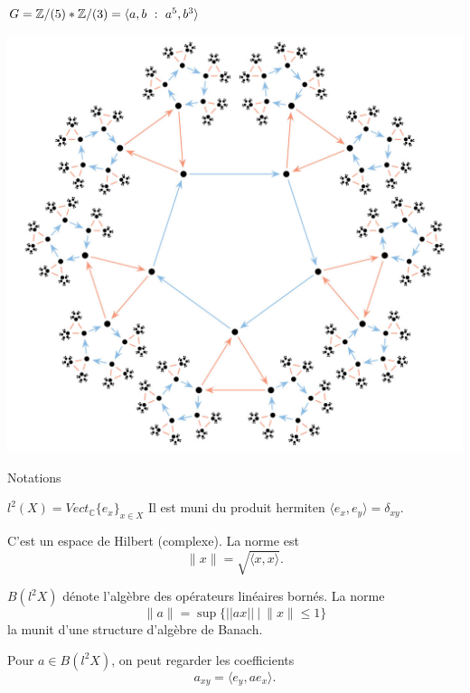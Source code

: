 \begin{frame}{$G= \Z/(5)\ast \Z/(3) = \langle a,b \ : \ a^5, b^3\rangle$}
\begin{center}
\vfill
\includegraphics[width=0.8\linewidth]{PSL2}
\vfill
\end{center}
\end{frame}



\begin{frame}{Notations} 
\begin{block}{$l^2(X)=Vect_{\mathbb C} \{e_x\}_{x\in X}$}
Il est muni du produit hermiten $\langle e_x, e_y\rangle =\delta_{xy}$. 
\end{block}
C'est un espace de Hilbert (complexe). La norme est \[\|x\| =\sqrt{\langle x, x\rangle}.\]
\begin{block}{$B(l^2X)$ d\'enote l'alg\`ebre des op\'erateurs lin\'eaires born\'es. }
La norme
\[\|a\| = \sup \{ ||ax|| \ | \ \|x\| \leq 1 \} \] 
la munit d'une structure d'alg\`ebre de Banach.
\end{block}
\vfill
Pour $a\in B(l^2 X)$, on peut regarder les coefficients \[a_{xy} = \langle e_y, ae_x \rangle .\]
\end{frame}

